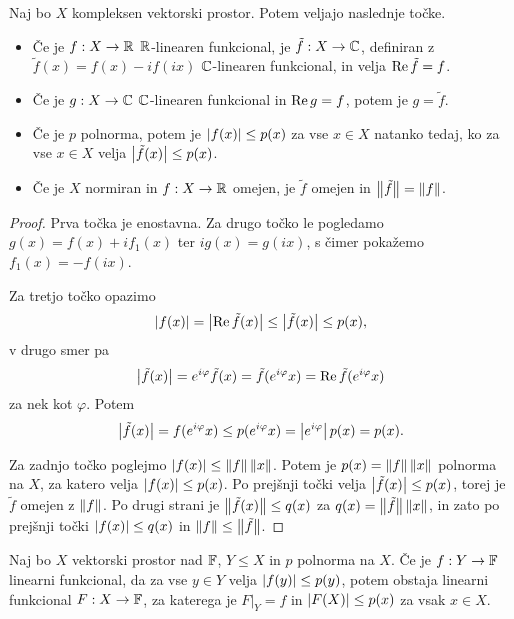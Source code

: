 
\begin{lema}
  Naj bo $X$ kompleksen vektorski prostor.
  Potem veljajo naslednje točke.
  \begin{itemize}
  \item Če je $f: X \to \mathbb{R}$ $\mathbb{R}$-linearen funkcional, je $\tilde{f}: X \to \mathbb{C}$,
	definiran z $\tilde{f}(x) = f(x) - i f(ix)$ $\mathbb{C}$-linearen funkcional, in
	velja $\operatorname{Re} \tilde{f} = f$.
  \item Če je $g: X \to \mathbb{C}$ $\mathbb{C}$-linearen funkcional in $\operatorname{Re} g = f$, potem je
	$g = \tilde{f}$.
  \item Če je $p$ polnorma, potem je $\left| f(x) \right| \le p(x)$ za vse $x \in X$
	natanko tedaj, ko za vse $x \in X$ velja $\left| \tilde{f}(x) \right| \le p(x)$.
  \item Če je $X$ normiran in $f: X \to \mathbb{R}$ omejen, je $\tilde{f}$ omejen in
	$\left\lVert\tilde{f}\right\rVert = \left\lVert f\right\rVert$.
  \end{itemize}
\end{lema}

\begin{proof}
  Prva točka je enostavna.
  Za drugo točko le pogledamo $g(x) = f(x) + i f_1(x)$ ter $i g(x) = g(ix)$, s
  čimer pokažemo $f_1(x) = -f(ix)$.

  Za tretjo točko opazimo
  \[
	\left| f(x) \right| = \left| \operatorname{Re} \tilde{f}(x) \right| \le \left| \tilde{f}(x) \right| \le p(x),
  \]
  v drugo smer pa
  \[
	\left| \tilde{f}(x) \right| = e^{i \varphi} \tilde{f}(x) = \tilde{f}(e^{i \varphi} x)
	= \operatorname{Re} \tilde{f}(e^{i \varphi} x)
  \]
  za nek kot $\varphi$.
  Potem
  \[
	\left| \tilde{f}(x) \right| = f(e^{i \varphi} x) \le p(e^{i \varphi} x) = \left| e^{i
		\varphi} \right| p(x) = p(x).
  \]

  Za zadnjo točko poglejmo $\left| f(x) \right| \le \left\lVert f\right\rVert \left\lVert x\right\rVert$.
  Potem je $p(x) = \left\lVert f\right\rVert \left\lVert x\right\rVert$ polnorma na $X$, za katero velja
  $\left| f(x) \right| \le p(x)$.
  Po prejšnji točki velja $\left| \tilde{f}(x) \right| \le p(x)$, torej je $\tilde{f}$
  omejen z $\left\lVert f\right\rVert$.
  Po drugi strani je $\left\lVert\tilde{f}(x)\right\rVert \le q(x)$ za $q(x) = \left\lVert\tilde{f}\right\rVert
  \left\lVert x\right\rVert$, in zato po prejšnji točki $\left| f(x) \right| \le q(x)$ in $\left\lVert f\right\rVert \le
  \left\lVert\tilde{f}\right\rVert$.
\end{proof}


\begin{izrek}
  Naj bo $X$ vektorski prostor nad $\mathbb{F}$, $Y \le X$ in $p$ polnorma na $X$.
  Če je $f: Y \to \mathbb{F}$ linearni funkcional, da za vse $y \in Y$ velja $\left| f(y) \right|
  \le p(y)$, potem obstaja linearni funkcional $F: X \to \mathbb{F}$, za katerega je
  $\left. F \right|_Y = f$ in $\left| F(X) \right| \le p(x)$ za vsak $x \in X$.
\end{izrek}


